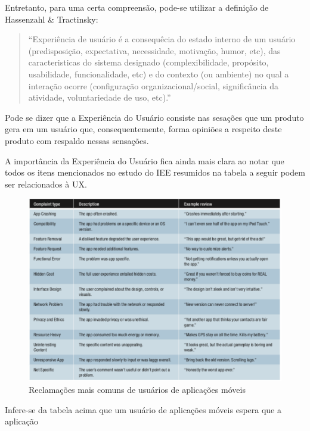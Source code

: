  Entretanto, para uma certa compreensão, pode-se utilizar a definição de Hassenzahl & 
 Tractinsky:
 
 \begin{quote}
 \enquote{Experiência de usuário é a consequêcia do estado interno de um usuário
(predisposição, expectativa, necessidade, motivação, humor, etc), das
caracteristicas do sistema designado (complexibilidade, propósito, usabilidade,
funcionalidade, etc) e do contexto (ou ambiente) no qual a interação ocorre
(configuração organizacional/social, significância da atividade, voluntariedade de uso, 
etc).} \cite{Law2008}
\end{quote}
 
 Pode se dizer que a Experiência do Usuário consiste nas sesações que 
 um produto gera em um usuário que, consequentemente, forma opiniões a respeito
 deste produto com respaldo nessas sensações.
 
 A importância da Experiência do Usuário fica ainda mais clara ao notar que
 todos os itens mencionados no estudo do IEE \cite{Khalid2015} resumidos na 
 tabela a seguir podem ser relacionados à UX.

\begin{figure}[htb]
    \centering
    \includegraphics[width=\textwidth]{images/mobile_users_complaints_table}
    \caption[Reclamações mais comuns de usuários de aplicações móveis]
    {Reclamações mais comuns de usuários de aplicações móveis \cite{Khalid2015}}
    \label{fig:mobile_users_complaints_table}
\end{figure}

Infere-se da tabela acima que um usuário de aplicações móveis espera que a 
aplicação

